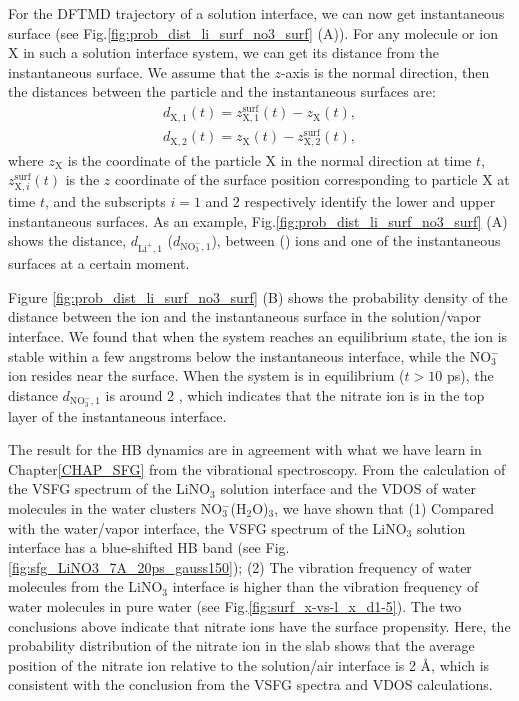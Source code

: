 For the DFTMD trajectory of a solution interface, we can now get instantaneous surface (see Fig.\thinspace\ref{fig:prob_dist_li_surf_no3_surf} (A)).
For any molecule or ion X in such a solution interface system, we can get its distance from the instantaneous surface.
We assume that the $z$-axis is the normal direction, then the distances between the particle and the instantaneous surfaces are:
%
\begin{eqnarray}
    d_{\text{X},1}(t)=  z^\text{surf}_{\text{X},1}(t) - z_{\text{X}}(t),\label{eq:distance_particle2surf_1}\\
    d_{\text{X},2}(t)= z_{\text{X}}(t) - z^\text{surf}_{\text{X},2}(t), 
\label{eq:distance_particle2surf_2}
\end{eqnarray}
%
where $z_{\text{X}}$ is the coordinate of the particle X in the normal direction at time $t$, 
$z^\text{surf}_{\text{X},i}(t)$ is the $z$ coordinate of the surface position corresponding to particle X at time $t$, 
and the subscripts $i=1$ and 2 respectively identify the lower and upper instantaneous surfaces.
As an example, Fig.\thinspace\ref{fig:prob_dist_li_surf_no3_surf} (A) shows the distance, 
$d_{\text{Li}^+,1}$ ($d_{\text{NO}_3^-,1}$), between \Li (\nitrate) ions and one of the instantaneous surfaces at a certain moment.

Figure \ref{fig:prob_dist_li_surf_no3_surf} (B) shows the probability density of the distance between the ion and the instantaneous surface in the \LiN solution/vapor interface. We found that when the system reaches an equilibrium state, 
the \Li ion is stable within a few angstroms below the instantaneous interface, while the NO$^-_3$ ion resides near the surface. 
When the system is in equilibrium ($t>10$ ps), the distance $d_{\text{NO}_3^-,1}$ is around 2 \A, 
which indicates that the nitrate ion is in the top layer of the instantaneous interface. 

The result for the HB dynamics are in agreement with what we have learn in Chapter\thinspace\ref{CHAP_SFG} 
from the vibrational spectroscopy.
From the calculation of the VSFG spectrum of the LiNO$_3$ solution interface and the VDOS of water molecules in the water clusters NO$^-_3$(H$_2$O)$_3$,
we have shown that (1) Compared with the water/vapor interface, the VSFG spectrum of the LiNO$_3$ solution interface has a blue-shifted HB band 
(see Fig.\thinspace\ref{fig:sfg_LiNO3_7A_20ps_gauss150});
(2) The vibration frequency of water molecules from the LiNO$_3$ interface is higher than the vibration frequency of water molecules in pure water 
(see Fig.\thinspace\ref{fig:surf_x-vs-l_x_d1-5}).
The two conclusions above indicate that nitrate ions have the surface propensity. 
Here, the probability distribution of the nitrate ion in the slab shows that the average position of the nitrate ion relative to the solution/air interface is 2 \AA,
which is consistent with the conclusion from the VSFG spectra and VDOS calculations.
%
